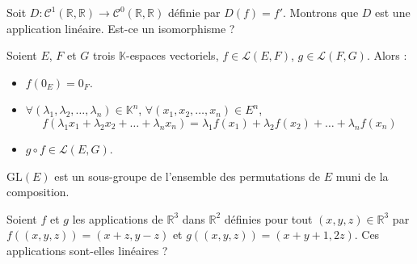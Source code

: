 \documentclass[a4paper,10pt]{report}
\begin{document}
\begin{Exemple} Soit $D : \mathcal{C}^1(\mathbb{R}, \mathbb{R}) \rightarrow \mathcal{C}^0(\mathbb{R}, \mathbb{R})$ définie par $D(f)=f'$. Montrons que $D$ est une application linéaire. Est-ce un isomorphisme ?


\vspace{5cm}
\end{Exemple}

\begin{Proposition}{}
Soient $E$, $F$ et $G$ trois $\mathbb{K}$-espaces vectoriels, $f \in \mathcal{L}(E,F)$, $g \in \mathcal{L}(F,G)$. Alors :

\begin{itemize}
\item $f(0_E)=0_F$.
\item $\forall (\lambda_1, \lambda_2, \ldots, \lambda_n) \in \mathbb{K}^n$, $\forall (x_1,x_2, \ldots, x_n) \in E^n$,
$$ f( \lambda_1x_1+ \lambda_2 x_2 + \ldots + \lambda_n x_n) = \lambda_1 f(x_1) + \lambda_2 f(x_2) + \ldots + \lambda_n f(x_n) $$
\item $g \circ f \in \mathcal{L}(E,G)$.
\end{itemize}
\end{Proposition}

\begin{Remarque}{} $\textrm{GL}(E)$ est un sous-groupe de l'ensemble des permutations de $E$ muni de la composition.
\end{Remarque}

\begin{ApplicationDirecte} Soient $f$ et $g$ les applications de $\mathbb{R}^3$ dans $\mathbb{R}^2$ définies pour tout $(x,y,z) \in \mathbb{R}^3$ par $f((x,y,z))=(x+z,y-z)$ et $g((x,y,z))= (x+y+1,2z)$. Ces applications sont-elles linéaires ?
\end{ApplicationDirecte} 
\end{document}
